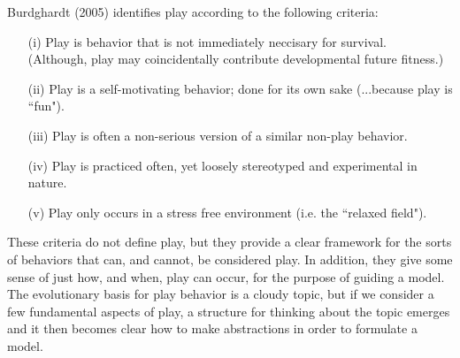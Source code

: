 \documentclass[12pt, letterpaper, fleqn]{article}
\begin{document}
%
Burdghardt (2005) identifies play according to the following criteria:
%
\begin{itemize}
\item[(i)] Play is behavior that is not immediately neccisary for survival.\\
(Although, play may coincidentally contribute developmental future fitness.) %
\item[(ii)] Play is a self-motivating behavior; done for its own sake (...because play is ``fun"). %
\item[(iii)] Play is often a non-serious version of a similar non-play behavior.
\item[(iv)] Play is practiced often, yet loosely stereotyped and experimental in nature. %
\item[(v)] Play only occurs in a stress free environment (i.e. the ``relaxed field"). %
\end{itemize}

%
%

%
These criteria do not define play, but they provide a clear framework for the sorts of behaviors that can, and cannot, be considered play. 
%
In addition, they give some sense of just how, and when, play can occur, for the purpose of guiding a model.  %
The evolutionary basis for play behavior is a cloudy topic, but if we consider a few fundamental aspects of play, a structure for thinking about the topic emerges and it then becomes clear how to make abstractions in order to formulate a model.

%
%
\end{document}
